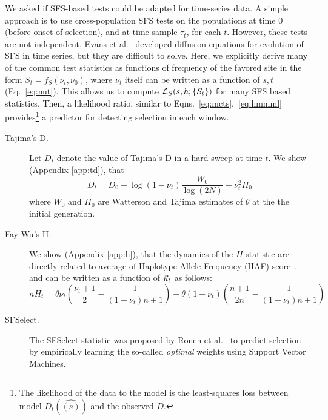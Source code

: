 \documentclass[11pt]{article}
\begin{document}
We asked if SFS-based tests could be adapted for time-series data. A
simple approach is to use cross-population SFS tests on the
populations at time $0$ (before onset of selection), and at time
sample $\tau_t$, for each $t$. However, these tests are not
independent. Evans et al.~\cite{evans2007non} developed diffusion
equations for evolution of SFS in time series, but they are difficult
to solve. Here, we explicitly derive many of the common test
statistics as functions of frequency of the favored site in the form
$S_t=f_S(\nu_t,\nu_0)$, where $\nu_t$ itself can be written as a
function of $s,t$ (Eq.~\ref{eq:nut}). This allows us to compute
${\cal L}_S(s,h; \{S_t\})$ for many SFS based statistics. Then, a
likelihood ratio, similar to Eqns.~\ref{eq:mcts},~\ref{eq:hmmml}
provides\footnote{The likelihood of the data to the model is the
  least-squares loss between model $D_t(\hat{(s)})$ and the observed
  $D$.} a predictor for detecting selection in each window.
\begin{description}
\item [Tajima's D.] Let $D_t$ denote the value of Tajima's D in a hard
  sweep at time $t$. We show (Appendix \ref{app:td}), that
  \begin{equation}
    D_t=D_0-\log(1-\nu_t) \frac{W_0}{\log(2N)} -\nu_t^2 \Pi_0
    \label{eq:tdt}    
  \end{equation}
  where $W_0$ and $\Pi_0$ are Watterson and Tajima estimates of
  $\theta$ at the the initial generation.  
\item[Fay Wu's H.] We show (Appendix \ref{app:h}), that the dynamics
  of the $H$ statistic are directly related to average of Haplotype
  Allele Frequency (HAF) score~\cite{ronen2015predicting}, and can be
  written as a function of $\vec{u}_t$ as follows:
  \begin{equation}
    nH_t= \theta \nu_t \left(\frac{\nu_t+1}{2} -
      \frac{1}{(1-\nu_t)n+1}\right) + \theta
    (1-\nu_t)\left(\frac{n+1}{2n}-\frac{1}{(1-\nu_t)n+1}\right)
    \label{eq:ht}
  \end{equation}	
	
\item[SFSelect.]  The SFSelect statistic
  was proposed by Ronen et al.~\cite{ronen2013learning} to predict
  selection by empirically learning the so-called \emph{optimal}
  weights using Support Vector Machines.
\end{description}
\end{document}
